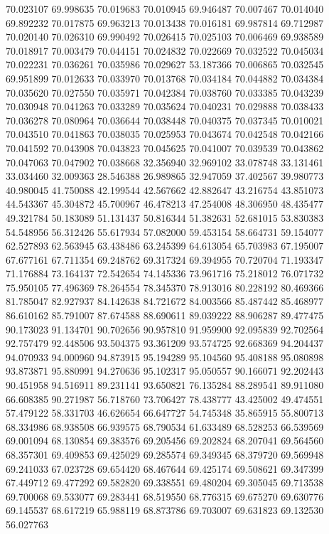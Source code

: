 70.023107
69.998635
70.019683
70.010945
69.946487
70.007467
70.014040
69.892232
70.017875
69.963213
70.013438
70.016181
69.987814
69.712987
70.020140
70.026310
69.990492
70.026415
70.025103
70.006469
69.938589
70.018917
70.003479
70.044151
70.024832
70.022669
70.032522
70.045034
70.022231
70.036261
70.035986
70.029627
53.187366
70.006865
70.032545
69.951899
70.012633
70.033970
70.013768
70.034184
70.044882
70.034384
70.035620
70.027550
70.035971
70.042384
70.038760
70.033385
70.043239
70.030948
70.041263
70.033289
70.035624
70.040231
70.029888
70.038433
70.036278
70.080964
70.036644
70.038448
70.040375
70.037345
70.010021
70.043510
70.041863
70.038035
70.025953
70.043674
70.042548
70.042166
70.041592
70.043908
70.043823
70.045625
70.041007
70.039539
70.043862
70.047063
70.047902
70.038668
32.356940
32.969102
33.078748
33.131461
33.034460
32.009363
28.546388
26.989865
32.947059
37.402567
39.980773
40.980045
41.750088
42.199544
42.567662
42.882647
43.216754
43.851073
44.543367
45.304872
45.700967
46.478213
47.254008
48.306950
48.435477
49.321784
50.183089
51.131437
50.816344
51.382631
52.681015
53.830383
54.548956
56.312426
55.617934
57.082000
59.453154
58.664731
59.154077
62.527893
62.563945
63.438486
63.245399
64.613054
65.703983
67.195007
67.677161
67.711354
69.248762
69.317324
69.394955
70.720704
71.193347
71.176884
73.164137
72.542654
74.145336
73.961716
75.218012
76.071732
75.950105
77.496369
78.264554
78.345370
78.913016
80.228192
80.469366
81.785047
82.927937
84.142638
84.721672
84.003566
85.487442
85.468977
86.610162
85.791007
87.674588
88.690611
89.039222
88.906287
89.477475
90.173023
91.134701
90.702656
90.957810
91.959900
92.095839
92.702564
92.757479
92.448506
93.504375
93.361209
93.574725
92.668369
94.204437
94.070933
94.000960
94.873915
95.194289
95.104560
95.408188
95.080898
93.873871
95.880991
94.270636
95.102317
95.050557
90.166071
92.202443
90.451958
94.516911
89.231141
93.650821
76.135284
88.289541
89.911080
66.608385
90.271987
56.718760
73.706427
78.438777
43.425002
49.474551
57.479122
58.331703
46.626654
66.647727
54.745348
35.865915
55.800713
68.334986
68.938508
66.939575
68.790534
61.633489
68.528253
66.539569
69.001094
68.130854
69.383576
69.205456
69.202824
68.207041
69.564560
68.357301
69.409853
69.425029
69.285574
69.349345
68.379720
69.569948
69.241033
67.023728
69.654420
68.467644
69.425174
69.508621
69.347399
67.449712
69.477292
69.582820
69.338551
69.480204
69.305045
69.713538
69.700068
69.533077
69.283441
68.519550
68.776315
69.675270
69.630776
69.145537
68.617219
65.988119
68.873786
69.703007
69.631823
69.132530
56.027763
